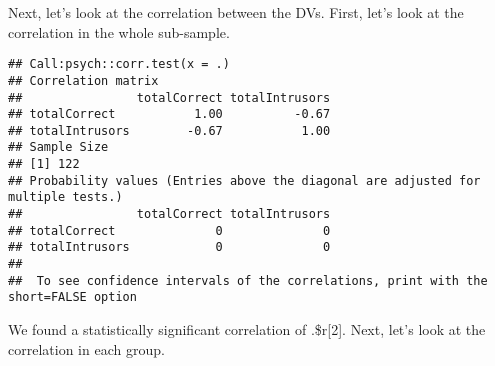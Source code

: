 \documentclass[12pt,]{article}
\newenvironment{Shaded}{\begin{snugshade}}{\end{snugshade}}
\newcommand{\DataTypeTok}[1]{\textcolor[rgb]{0.13,0.29,0.53}{#1}}
\newcommand{\KeywordTok}[1]{\textcolor[rgb]{0.13,0.29,0.53}{\textbf{#1}}}
\newcommand{\NormalTok}[1]{#1}
\newcommand{\OperatorTok}[1]{\textcolor[rgb]{0.81,0.36,0.00}{\textbf{#1}}}
\newcommand{\StringTok}[1]{\textcolor[rgb]{0.31,0.60,0.02}{#1}}
\begin{document}
Next, let's look at the correlation between the DVs. First, let's look
at the correlation in the whole sub-sample.

\begin{Shaded}
\end{Shaded}

\begin{verbatim}
## Call:psych::corr.test(x = .)
## Correlation matrix 
##                totalCorrect totalIntrusors
## totalCorrect           1.00          -0.67
## totalIntrusors        -0.67           1.00
## Sample Size 
## [1] 122
## Probability values (Entries above the diagonal are adjusted for multiple tests.) 
##                totalCorrect totalIntrusors
## totalCorrect              0              0
## totalIntrusors            0              0
## 
##  To see confidence intervals of the correlations, print with the short=FALSE option
\end{verbatim}

We found a statistically significant correlation of .\$r{[}2{]}. Next,
let's look at the correlation in each group.

\begin{Shaded}
\end{Shaded}
\end{document}
